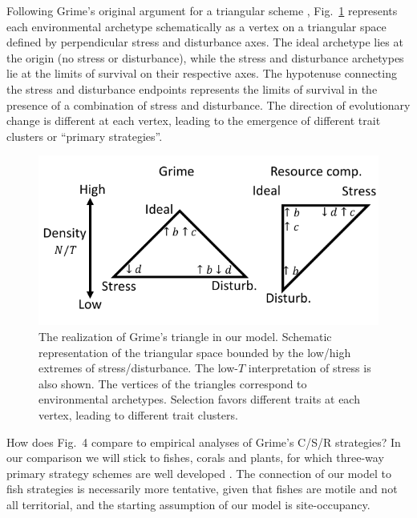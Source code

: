 \documentclass[11pt]{article}
\begin{document}
Following Grime's original argument for a triangular scheme \citep{grime_1977}, Fig.~\ref{fig:axes} represents each environmental archetype schematically as a vertex on a triangular space defined by perpendicular stress and disturbance axes. The ideal archetype lies at the origin (no stress or disturbance), while the stress and disturbance archetypes lie at the limits of survival on their respective axes. The hypotenuse connecting the stress and disturbance endpoints represents the limits of survival in the presence of a combination of stress and disturbance. The direction of evolutionary change is different at each vertex, leading to the emergence of different trait clusters or ``primary strategies''. 

\begin{figure}
\centering
\includegraphics[scale=1]{axes.pdf}
\caption{\label{fig:axes} The realization of Grime's triangle in our model. Schematic representation of the triangular space bounded by the low/high extremes of stress/disturbance. The low-$T$ interpretation of stress is also shown. The vertices of the triangles correspond to environmental archetypes. Selection favors different traits at each vertex, leading to different trait clusters.} 
\end{figure}

How does Fig.~4 compare to empirical analyses of Grime's C/S/R strategies? In our comparison we will stick to fishes, corals and plants, for which three-way primary strategy schemes are well developed \citep{grime_1977,winemiller_1992,darling_2012}. The connection of our model to fish strategies is necessarily more tentative, given that fishes are motile and not all territorial, and the starting assumption of our model is site-occupancy. 
\end{document}
